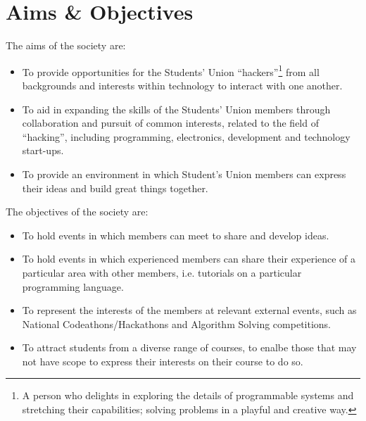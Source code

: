 \section{Aims \& Objectives}
\begin{clause}
The aims of the society are:
	\begin{itemize}
		\item To provide opportunities for the Students' Union ``hackers''\footnote{A person who delights in exploring the details of programmable systems and stretching their capabilities; solving problems in a playful and 		creative way.} from all backgrounds and interests within technology to interact with one another.
		\item To aid in expanding the skills of the Students' Union members through collaboration and pursuit of common interests, related to the field of ``hacking'', including programming, electronics, development and technology start-ups.
		\item To provide an environment in which Student's Union members can express their ideas and build great things together.
	\end{itemize}
\end{clause}
\begin{clause}
The objectives of the society are:
	\begin{itemize}
		\item To hold events in which members can meet to share and develop ideas.
		\item To hold events in which experienced members can share their experience of a particular area with other members, i.e. tutorials on a particular programming language.
		\item To represent the interests of the members at relevant external events, such as National Codeathons/Hackathons and Algorithm Solving competitions.
		\item To attract students from a diverse range of courses, to enalbe those that may not have scope to express their interests on their course to do so.
	\end{itemize}
\end{clause}